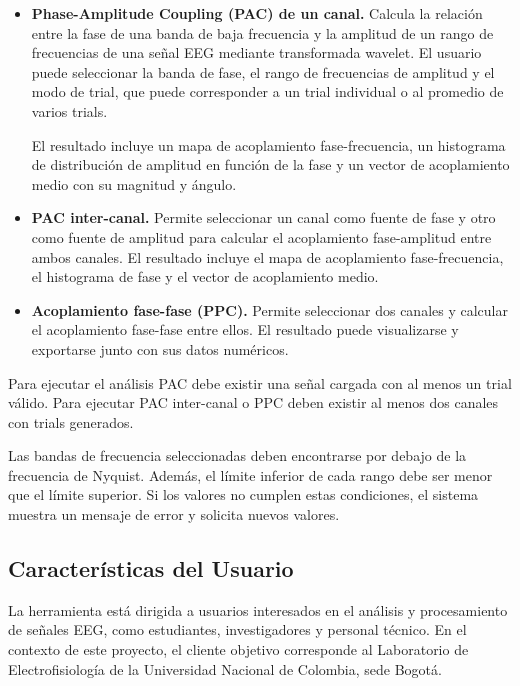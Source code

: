 \documentclass[12pt, letterpaper]{article}
\begin{document}
\begin{itemize}
    \item \textbf{Phase-Amplitude Coupling (PAC) de un canal.} Calcula la
    relación entre la fase de una banda de baja frecuencia y la amplitud de
    un rango de frecuencias de una señal EEG mediante transformada wavelet.
    El usuario puede seleccionar la banda de fase, el rango de frecuencias
    de amplitud y el modo de trial, que puede corresponder a un trial
    individual o al promedio de varios trials.

    El resultado incluye un mapa de acoplamiento fase-frecuencia, un
    histograma de distribución de amplitud en función de la fase y un vector
    de acoplamiento medio con su magnitud y ángulo.

    \item \textbf{PAC inter-canal.} Permite seleccionar un canal como fuente
    de fase y otro como fuente de amplitud para calcular el acoplamiento
    fase-amplitud entre ambos canales. El resultado incluye el mapa de
    acoplamiento fase-frecuencia, el histograma de fase y el vector de
    acoplamiento medio.

    \item \textbf{Acoplamiento fase-fase (PPC).} Permite seleccionar dos canales
    y calcular el acoplamiento fase-fase entre ellos. El resultado puede
    visualizarse y exportarse junto con sus datos numéricos.

\end{itemize}

Para ejecutar el análisis PAC debe existir una señal cargada con al menos un
trial válido. Para ejecutar PAC inter-canal o PPC deben existir al menos dos
canales con trials generados.

Las bandas de frecuencia seleccionadas deben encontrarse por debajo de la
frecuencia de Nyquist. Además, el límite inferior de cada rango debe ser
menor que el límite superior. Si los valores no cumplen estas condiciones,
el sistema muestra un mensaje de error y solicita nuevos valores.

\subsection{Características del Usuario}

La herramienta está dirigida a usuarios interesados en el análisis y
procesamiento de señales EEG, como estudiantes, investigadores y personal
técnico. En el contexto de este proyecto, el cliente objetivo corresponde al
Laboratorio de Electrofisiología de la Universidad Nacional de Colombia,
sede Bogotá.
\end{document}
